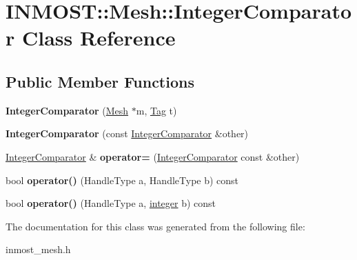 \hypertarget{classINMOST_1_1Mesh_1_1IntegerComparator}{\section{I\-N\-M\-O\-S\-T\-:\-:Mesh\-:\-:Integer\-Comparator Class Reference}
\label{classINMOST_1_1Mesh_1_1IntegerComparator}
}
\subsection*{Public Member Functions}
\begin{DoxyCompactItemize}
\item 
\hypertarget{classINMOST_1_1Mesh_1_1IntegerComparator_a1a7c2ba35315439921b6a51a2db7a58f}{{\bfseries Integer\-Comparator} (\hyperlink{classINMOST_1_1Mesh}{Mesh} $\ast$m, \hyperlink{classINMOST_1_1Tag}{Tag} t)}\label{classINMOST_1_1Mesh_1_1IntegerComparator_a1a7c2ba35315439921b6a51a2db7a58f}

\item 
\hypertarget{classINMOST_1_1Mesh_1_1IntegerComparator_a22316d8856c0752c89d4fc56cd605da5}{{\bfseries Integer\-Comparator} (const \hyperlink{classINMOST_1_1Mesh_1_1IntegerComparator}{Integer\-Comparator} \&other)}\label{classINMOST_1_1Mesh_1_1IntegerComparator_a22316d8856c0752c89d4fc56cd605da5}

\item 
\hypertarget{classINMOST_1_1Mesh_1_1IntegerComparator_a32b1d4ade571c1da94618f2e3fdbc7a4}{\hyperlink{classINMOST_1_1Mesh_1_1IntegerComparator}{Integer\-Comparator} \& {\bfseries operator=} (\hyperlink{classINMOST_1_1Mesh_1_1IntegerComparator}{Integer\-Comparator} const \&other)}\label{classINMOST_1_1Mesh_1_1IntegerComparator_a32b1d4ade571c1da94618f2e3fdbc7a4}

\item 
\hypertarget{classINMOST_1_1Mesh_1_1IntegerComparator_a521ea8d9df71795f037272d6a45523de}{bool {\bfseries operator()} (Handle\-Type a, Handle\-Type b) const }\label{classINMOST_1_1Mesh_1_1IntegerComparator_a521ea8d9df71795f037272d6a45523de}

\item 
\hypertarget{classINMOST_1_1Mesh_1_1IntegerComparator_a4e34a23fd113587793d17bdb3ff1b329}{bool {\bfseries operator()} (Handle\-Type a, \hyperlink{classINMOST_1_1Storage_aec96942bc647417a801e2895b45964d2}{integer} b) const }\label{classINMOST_1_1Mesh_1_1IntegerComparator_a4e34a23fd113587793d17bdb3ff1b329}

\end{DoxyCompactItemize}


The documentation for this class was generated from the following file\-:\begin{DoxyCompactItemize}
\item 
inmost\-\_\-mesh.\-h\end{DoxyCompactItemize}
